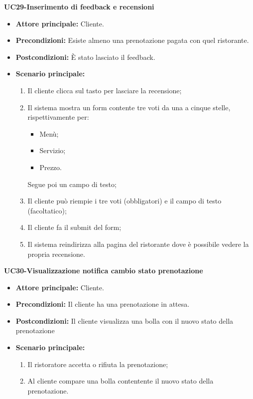 \textbf{UC29-Inserimento di feedback e recensioni}
\begin{itemize}
\item \textbf{Attore principale:} Cliente.
\item \textbf{Precondizioni:} Esiste almeno una prenotazione pagata con quel ristorante.
\item \textbf{Postcondizioni:} È stato lasciato il feedback.
\item \textbf{Scenario principale:}
\begin{enumerate}
    \item Il cliente clicca sul tasto per lasciare la recensione;
    \item Il sistema mostra un form contente tre voti da una a cinque stelle, rispettivamente per:
  \begin{itemize}
    \item Menù;
    \item Servizio;
    \item Prezzo.
  \end{itemize}
      Segue poi un campo di testo;
    \item Il cliente può riempie i tre voti (obbligatori) e il campo di testo (facoltatico);
    \item Il cliente fa il submit del form;
    \item Il sistema reindirizza alla pagina del ristorante dove è possibile vedere la propria recensione.
\end{enumerate}
\end{itemize}

\textbf{UC30-Visualizzazione notifica cambio stato prenotazione}
\begin{itemize}
\item \textbf{Attore principale:} Cliente.
\item \textbf{Precondizioni:} Il cliente ha una prenotazione in attesa.
\item \textbf{Postcondizioni:} Il cliente visualizza una bolla con il nuovo stato della prenotazione
\item \textbf{Scenario principale:}
\begin{enumerate}
    \item Il ristoratore accetta o rifiuta la prenotazione;
    \item Al cliente compare una bolla contentente il nuovo stato della prenotazione.
\end{enumerate}
\end{itemize}

